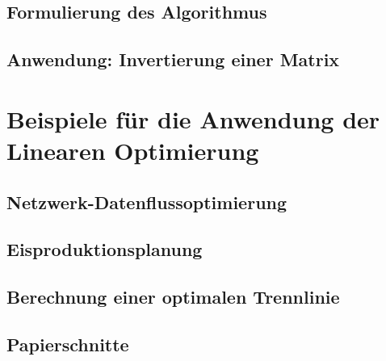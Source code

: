 \documentclass{scrartcl}
\begin{document}
\subsection{Formulierung des Algorithmus}


\subsection{Anwendung: Invertierung einer Matrix}



\section{Beispiele für die Anwendung der Linearen Optimierung}

\subsection{Netzwerk-Datenflussoptimierung}

\subsection{Eisproduktionsplanung}

\subsection{Berechnung einer optimalen Trennlinie}

\subsection{Papierschnitte}

\end{document}
